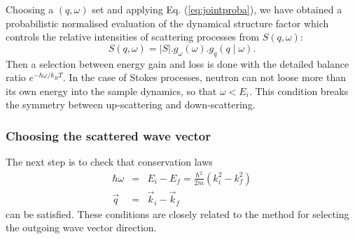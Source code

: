 Choosing a $(q, \omega)$ set and applying Eq. (\ref{eq:jointproba}), we have obtained a probabilistic normalised evaluation of the dynamical structure factor which controls the relative intensities of scattering processes from $S(q, \omega)$:
\begin{equation}
S(q, \omega) = |S|.g_\omega(\omega).g_q(q \mid \omega) .
\end{equation}
Then a selection between energy gain and loss is done with the detailed balance ratio $e^{-\hbar \omega / k_B T}$. In the case of Stokes processes, neutron can not loose more than its own energy into the sample dynamics, so that $\omega < E_i$. This condition breaks the symmetry between up-scattering and down-scattering.

\subsubsection{Choosing the scattered wave vector}

The next step is to check that conservation laws
\begin{eqnarray}
\hbar \omega &=& E_i - E_f = \frac{\hbar^2}{2m}(k_i^2 - k_f^2) \label{eq:w-transfer} \\
\vec q &=& \vec k_i - \vec k_f \label{eq:q-transfer}
\end{eqnarray}
can be satisfied. These conditions are closely related to the method for selecting the outgoing wave vector direction.

